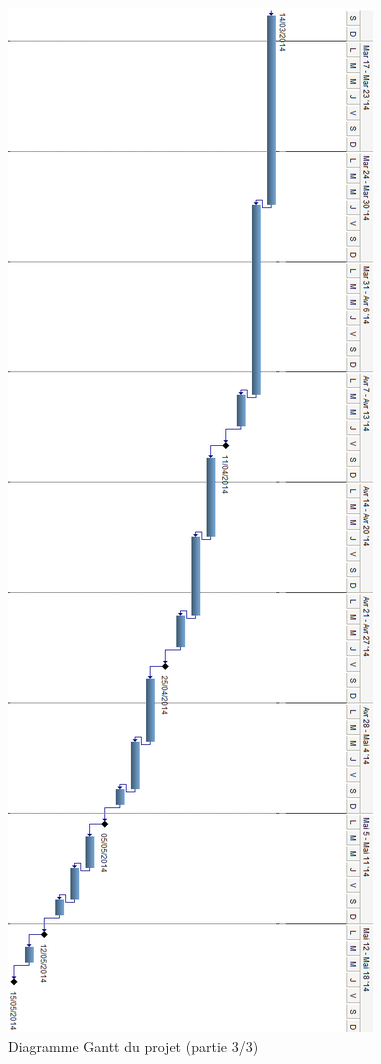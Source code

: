 \documentclass[a4paper, 12pt, twoside]{article}
\begin{document}
\begin{figure}[h]
  \center
  \includegraphics[scale=0.45]{diag_gant3.png}
  \caption{Diagramme Gantt du projet (partie 3/3)}
  \label{diagGant3}
\end{figure}
\restoregeometry

\end{document}
